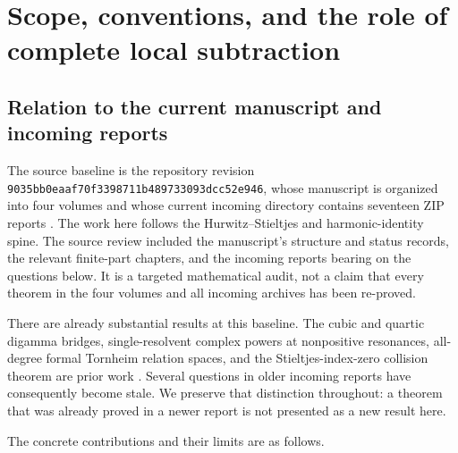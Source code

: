 \documentclass[11pt]{article}
\numberwithin{equation}{section}
\theoremstyle{plain}
\theoremstyle{definition}
\theoremstyle{remark}
\newcommand{\src}[1]{\texttt{\small\nolinkurl{#1}}}
\begin{document}
\hypersetup{pageanchor=true}
\tableofcontents
\clearpage
{}

\section{Scope, conventions, and the role of complete local subtraction}
\label{scope:section}

\subsection{Relation to the current manuscript and incoming reports}

The source baseline is the repository revision
\src{9035bb0eaaf70f3398711b489733093dcc52e946}, whose manuscript is
organized into four volumes and whose current incoming directory contains
seventeen ZIP reports \cite{repo:main}. The work here follows the
Hurwitz--Stieltjes and harmonic-identity spine. The source review included
the manuscript's structure and status records, the relevant finite-part
chapters, and the incoming reports bearing on the questions below.
It is a targeted mathematical audit, not a claim that every theorem in
the four volumes and all incoming archives has been re-proved.

There are already substantial results at this baseline. The cubic and
quartic digamma bridges, single-resolvent complex powers at nonpositive
resonances, all-degree formal Tornheim relation spaces, and the
Stieltjes-index-zero collision theorem are prior work
\cite{repo:cubic,repo:barnes,repo:quartic,repo:reflection}.
Several questions in older incoming reports have consequently become
stale. We preserve that distinction throughout: a theorem that was
already proved in a newer report is not presented as a new result here.

The concrete contributions and their limits are as follows.
\end{document}
